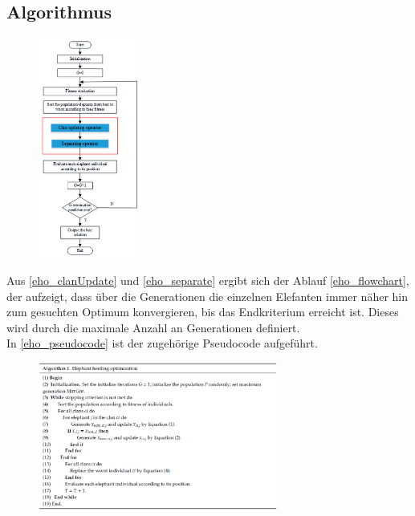 \subsection{Algorithmus}
\begin{figure}[ht]
    \begin{center}
        \includegraphics[width=0.3\textwidth]{assets/img/eho_flowchart.png}
        \caption[EHO Flowchart]{\cite[Li et al, S.4]{li_lei_alavi_wang_2020}}
        \label{eho_flowchart}
    \end{center}
\end{figure}
Aus \autoref{eho_clanUpdate} und \autoref{eho_separate} ergibt sich der Ablauf \autoref{eho_flowchart}, der aufzeigt, dass über die Generationen die einzelnen Elefanten immer näher hin zum gesuchten Optimum konvergieren, bis das Endkriterium erreicht ist. Dieses wird durch die maximale Anzahl an Generationen definiert.\\
In \autoref{eho_pseudocode} ist der zugehörige Pseudocode aufgeführt.\\
\begin{figure}[ht]
    \begin{center}
        \includegraphics[width=0.7\textwidth]{assets/img/eho_pseudocode.PNG}
        \caption[EHO Pseudocode]{\cite[Li et al, S.5]{li_lei_alavi_wang_2020}}
        \label{eho_pseudocode}
    \end{center}
\end{figure}
